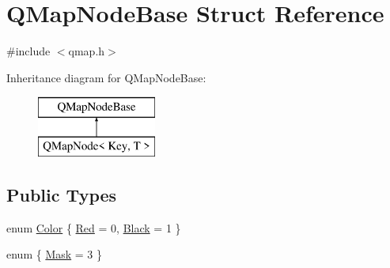 \hypertarget{struct_q_map_node_base}{}\section{Q\+Map\+Node\+Base Struct Reference}
\label{struct_q_map_node_base}


{\ttfamily \#include $<$qmap.\+h$>$}

Inheritance diagram for Q\+Map\+Node\+Base\+:\begin{figure}[H]
\begin{center}
\leavevmode
\includegraphics[height=2.000000cm]{struct_q_map_node_base}
\end{center}
\end{figure}
\subsection*{Public Types}
\begin{DoxyCompactItemize}
\item 
enum \hyperlink{struct_q_map_node_base_a8d262e109c5db0292c19141d585c96a9}{Color} \{ \hyperlink{struct_q_map_node_base_a8d262e109c5db0292c19141d585c96a9a9bffc80754cb87fa880417571e785e1b}{Red} = 0, 
\hyperlink{struct_q_map_node_base_a8d262e109c5db0292c19141d585c96a9a4a3c720b5a1ffee5b349ac2da8c5a2e1}{Black} = 1
 \}
\item 
enum \{ \hyperlink{struct_q_map_node_base_a98cd178a8587938441e879d638d4576cac454825c84685bfcd5173ffa84b23eb1}{Mask} = 3
 \}
\end{DoxyCompactItemize}
